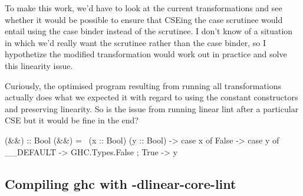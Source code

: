 \documentclass[a4paper, draft]{article}
\begin{document}
To make this work, we'd have to look at the current transformations and see
whether it would be possible to ensure that CSEing the case scrutinee would
entail using the case binder instead of the scrutinee. I don't know of a
situation in which we'd really want the scrutinee rather than the case binder,
so I hypothetize the modified transformation would work out in practice and
solve this linearity issue.



Curiously, the optimised program resulting from running all transformations
actually does what we expected it with regard to using the constant constructors
and preserving linearity. So is the issue from running linear lint after a
particular CSE but it would be fine in the end?
\begin{code}
(&&) :: Bool %
(&&) = \ (x :: Bool) (y :: Bool) ->
  case x of {
    False -> case y of { __DEFAULT -> GHC.Types.False };
    True -> y
  }
\end{code}

\subsection{Compiling ghc with -dlinear-core-lint}
\end{document}
